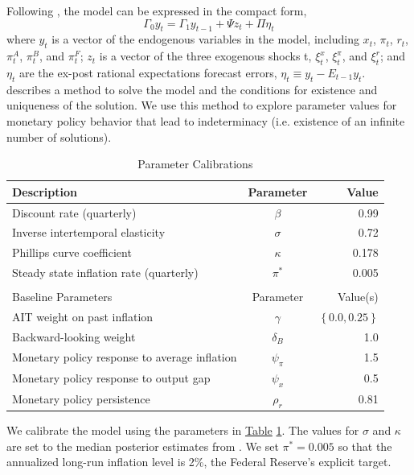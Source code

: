 \documentclass[english,authoryear,12pt]{elsarticle}
\begin{document}
Following \citet{sims2002}, the model can be expressed in the compact form,
\begin{equation}
	\Gamma_0 y_t = \Gamma_1 y_{t-1} + \Psi z_t + \Pi \eta_t
\end{equation}
where $y_t$ is a vector of the endogenous variables in the model, including $x_t$, $\pi_t$, $r_t$, $\pi_t^A$, $\pi_t^B$, and $\pi_t^F$; $z_t$ is a vector of the three exogenous shocks t, $\xi_t^x$, $\xi_t^\pi$, and $\xi_t^r$; and $\eta_t$ are the ex-post rational expectations forecast errors, $\eta_t \equiv y_t - E_{t-1} y_t$. \citet{sims2002} describes a method to solve the model and the conditions for existence and uniqueness of the solution. We use this method to explore parameter values for monetary policy behavior that lead to indeterminacy (i.e. existence of an infinite number of solutions).

\begin{table}[htp]
	\captionsetup{justification=centering}
	\caption{Parameter Calibrations}\label{tb:parms}
	\begin{center}
		\vspace*{-1pc}\begin{tabular}{lcr}
			Description & Parameter & Value \\ \hline
			Discount rate (quarterly) & $\beta$ & 0.99 \\
			Inverse intertemporal elasticity & $\sigma$ & 0.72 \\
			Phillips curve coefficient & $\kappa$ & 0.178 \\
			Steady state inflation rate (quarterly) & $\pi^*$ & 0.005 \\ [0.25pc]
			\hline \\ [-0.25pc]
			Baseline Parameters & Parameter & Value(s) \\ \hline
			AIT weight on past inflation & $\gamma$ & $\left\{ 0.0, 0.25 \right\}$ \\
			Backward-looking weight & $\delta_B$ & 1.0 \\
			Monetary policy response to average inflation & $\psi_\pi$ & 1.5 \\
			Monetary policy response to output gap & $\psi_x$ & 0.5 \\
			Monetary policy persistence & $\rho_r$ & 0.81 \\ \hline
		\end{tabular}
	\end{center}
\end{table}

We calibrate the model using the parameters in \href{tb:parms}{Table} \ref{tb:parms}. The values for $\sigma$ and $\kappa$ are set to the median posterior estimates from \citet{smetswouters2007}. We set $\pi^*=0.005$ so that the annualized long-run inflation level is 2\%, the Federal Reserve's explicit target.
\end{document}
